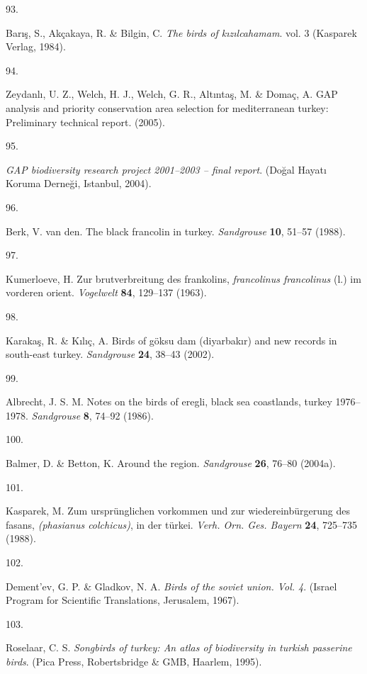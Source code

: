 \documentclass[
  letterpaper,
  DIV=11,
  numbers=noendperiod]{scrreprt}
\newlength{\cslhangindent}
\newlength{\csllabelwidth}
\newlength{\cslentryspacingunit} %
\newenvironment{CSLReferences}[2] %
 {%
  \setlength{\parindent}{0pt}
  \ifodd #1
  \let\oldpar\par
  \def\par{\hangindent=\cslhangindent\oldpar}
  \fi
  \setlength{\parskip}{#2\cslentryspacingunit}
 }%
 {}
\newcommand{\CSLLeftMargin}[1]{\parbox[t]{\csllabelwidth}{#1}}
\newcommand{\CSLRightInline}[1]{\parbox[t]{\linewidth - \csllabelwidth}{#1}\break}
\begin{document}
\begin{CSLReferences}{0}{0}
\leavevmode{}%
\CSLLeftMargin{93. }%
\CSLRightInline{Barış, S., Akçakaya, R. \& Bilgin, C. \emph{The birds of
kızılcahamam}. vol. 3 (Kasparek Verlag, 1984).}

\leavevmode{}%
\CSLLeftMargin{94. }%
\CSLRightInline{Zeydanlı, U. Z., Welch, H. J., Welch, G. R., Altıntaş,
M. \& Domaç, A. GAP analysis and priority conservation area selection
for mediterranean turkey: Preliminary technical report. (2005).}

\leavevmode{}%
\CSLLeftMargin{95. }%
\CSLRightInline{\emph{GAP biodiversity research project 2001--2003 --
final report}. (Doğal Hayatı Koruma Derneği, Istanbul, 2004).}

\leavevmode{}%
\CSLLeftMargin{96. }%
\CSLRightInline{Berk, V. van den. The black francolin in turkey.
\emph{Sandgrouse} \textbf{10}, 51--57 (1988).}

\leavevmode{}%
\CSLLeftMargin{97. }%
\CSLRightInline{Kumerloeve, H. Zur brutverbreitung des frankolins,
\emph{francolinus francolinus} (l.) im vorderen orient. \emph{Vogelwelt}
\textbf{84}, 129--137 (1963).}

\leavevmode{}%
\CSLLeftMargin{98. }%
\CSLRightInline{Karakaş, R. \& Kılıç, A. Birds of göksu dam (diyarbakır)
and new records in south-east turkey. \emph{Sandgrouse} \textbf{24},
38--43 (2002).}

\leavevmode{}%
\CSLLeftMargin{99. }%
\CSLRightInline{Albrecht, J. S. M. Notes on the birds of eregli, black
sea coastlands, turkey 1976--1978. \emph{Sandgrouse} \textbf{8}, 74--92
(1986).}

\leavevmode{}%
\CSLLeftMargin{100. }%
\CSLRightInline{Balmer, D. \& Betton, K. Around the region.
\emph{Sandgrouse} \textbf{26}, 76--80 (2004a).}

\leavevmode{}%
\CSLLeftMargin{101. }%
\CSLRightInline{Kasparek, M. Zum ursprünglichen vorkommen und zur
wiedereinbürgerung des fasans, \emph{(phasianus colchicus)}, in der
türkei. \emph{Verh. Orn. Ges. Bayern} \textbf{24}, 725--735 (1988).}

\leavevmode{}%
\CSLLeftMargin{102. }%
\CSLRightInline{Dement'ev, G. P. \& Gladkov, N. A. \emph{Birds of the
soviet union. Vol. 4}. (Israel Program for Scientific Translations,
Jerusalem, 1967).}

\leavevmode{}%
\CSLLeftMargin{103. }%
\CSLRightInline{Roselaar, C. S. \emph{Songbirds of turkey: An atlas of
biodiversity in turkish passerine birds}. (Pica Press, Robertsbridge \&
GMB, Haarlem, 1995).}

\end{CSLReferences}
\end{document}
